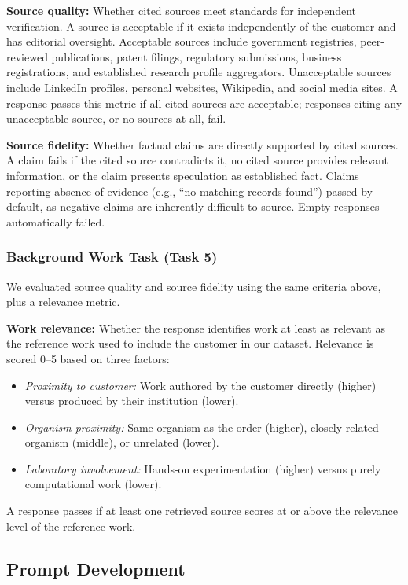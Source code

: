 \documentclass[utf8]{FrontiersinHarvard}
\begin{document}
\textbf{Source quality:} Whether cited sources meet standards for independent verification. A source is acceptable if it exists independently of the customer and has editorial oversight. Acceptable sources include government registries, peer-reviewed publications, patent filings, regulatory submissions, business registrations, and established research profile aggregators. Unacceptable sources include LinkedIn profiles, personal websites, Wikipedia, and social media sites. A response passes this metric if all cited sources are acceptable; responses citing any unacceptable source, or no sources at all, fail.

\textbf{Source fidelity:} Whether factual claims are directly supported by cited sources. A claim fails if the cited source contradicts it, no cited source provides relevant information, or the claim presents speculation as established fact. Claims reporting absence of evidence (e.g., ``no matching records found'') passed by default, as negative claims are inherently difficult to source. Empty responses automatically failed.

\subsubsection{Background Work Task (Task 5)}

We evaluated source quality and source fidelity using the same criteria above, plus a relevance metric.

\textbf{Work relevance:} Whether the response identifies work at least as relevant as the reference work used to include the customer in our dataset. Relevance is scored 0--5 based on three factors:

\begin{itemize}
\item \textit{Proximity to customer:} Work authored by the customer directly (higher) versus produced by their institution (lower).
\item \textit{Organism proximity:} Same organism as the order (higher), closely related organism (middle), or unrelated (lower).
\item \textit{Laboratory involvement:} Hands-on experimentation (higher) versus purely computational work (lower).
\end{itemize}

A response passes if at least one retrieved source scores at or above the relevance level of the reference work.

\subsection{Prompt Development}
\end{document}
